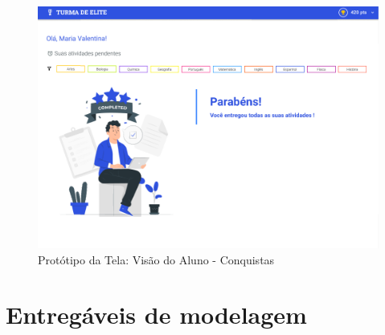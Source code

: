 \begin{apendicesenv}
\begin{figure}[htb]
    \centering
	\includegraphics[width=16cm]{imagens/Aluno-Conquista.png}
	\caption{\label{fig:conquista} Protótipo da Tela: Visão do Aluno - Conquistas}
\end{figure}
\FloatBarrier

\chapter{Entregáveis de modelagem}

\end{apendicesenv}
